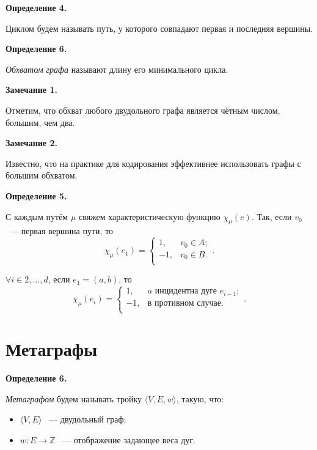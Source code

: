 \documentclass[14pt]{mmcs-article}
\begin{document}
\textbf{Определение 4.}

Циклом будем называть путь, у которого совпадают первая и последняя вершины.

\textbf{Определение 6.}

\textsl{Обхватом графа} называют длину его минимального цикла.

\textbf{Замечание 1.}

Отметим, что обхват любого двудольного графа является чётным числом, большим, чем два.

\textbf{Замечание 2.}

Известно, что на практике для кодирования эффективнее использовать графы с большим обхватом.

\textbf{Определение 5.}


С каждым путём $\mu$ свяжем характеристическую функцию $\chi_\mu(e)$.
Так, если $v_0$ ~--- первая вершина пути, то
\[
    \chi_{\mu}(e_1) =
    \left\{
        \begin{array}{ll}
        1,  & v_0 \in A;\\
        -1, & v_0 \in B. \\
        \end{array}
    \right..
\]

$\forall i \in 2, ..., d$, если $e_1 = (a, b)$, то
\[
    \chi_{\mu}(e_i) =
    \left\{
        \begin{array}{ll}
        1,  & a \text{ инцидентна дуге } e_{i-1};\\
        -1, & \text{в противном случае}. \\
        \end{array}
    \right..
\]

\pagebreak
\section*{Метаграфы}

\textbf{Определение 6.}

\textsl{Метаграфом} будем называть тройку $\langle V,E,w \rangle$, такую, что:

\begin{itemize}
    \item $\langle V,E \rangle$ ~--- двудольный граф;
    \item $w: E \rightarrow \mathbb{Z}$ ~--- отображение задающее веса дуг.
\end{itemize}
\end{document}
